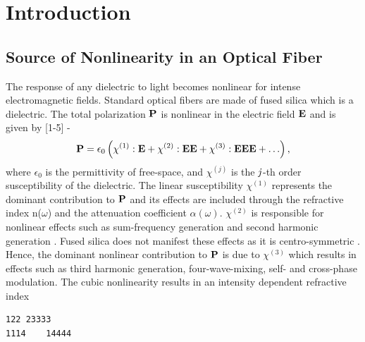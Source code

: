 
\renewcommand{\thechapter}{1}

\chapter{Introduction}

\section{Source of Nonlinearity in an Optical Fiber}

	The response of any dielectric to light becomes nonlinear
for intense electromagnetic fields.  Standard optical fibers are made of
fused silica which is a dielectric. The total polarization $\bf{P}$
is nonlinear in the electric field $\bf{E}$ and is given by [1-5] -
\begin{equation}
{\bf P} = \epsilon_{0} \left( \chi^{(1)} : {\bf E} + \chi^{(2)}
: {\bf EE} + \chi^{(3)} : {\bf EEE} + \ldots \right),
\end{equation}
where $\epsilon_0$ is the permittivity of free-space, and
$\chi^{(j)}$
is the ${\it j}$-th order susceptibility of the dielectric. The linear
susceptibility $\chi^{(1)}$ represents the dominant contribution to
$\bf{P}$ and its effects are included through the refractive index
n($\omega$) and the attenuation coefficient $\alpha(\omega)$. $\chi^{(2)}$
is responsible for nonlinear effects such as sum-frequency generation and
second harmonic generation \cite{Agrawal1, Shen}. Fused silica does not
manifest these effects as it is centro-symmetric \cite{Newell}. Hence, the dominant nonlinear
contribution to ${\bf P}$ is due to $\chi^{(3)}$ which results in effects
such as third harmonic generation, four-wave-mixing,  self- and
cross-phase modulation. The cubic nonlinearity results in an intensity
dependent refractive index

\begin{verbatim}
122	23333
1114	14444
\end{verbatim}

